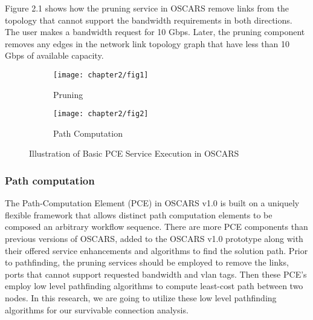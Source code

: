 Figure 2.1 shows how the pruning service in OSCARS remove links from the topology that cannot support the bandwidth requirements in both directions. The user makes a bandwidth request for 10 Gbps. Later, the pruning component removes any edges in the network link topology graph that have less than 10 Gbps of available capacity. 

\begin{figure*}[hbt!]
\centering
      	\begin{subfigure}{0.45\textwidth}
	\centering
		\texttt{[image: chapter2/fig1]}
		\caption{Pruning}
		\label{fig:pruning}
        \end{subfigure}%
	\hfill
	\begin{subfigure}{0.45\textwidth}\vspace{3em}
        	\centering
		\texttt{[image: chapter2/fig2]}\vspace{1em}
		\caption{Path Computation}\vspace{-3em}
		\label{fig:pathComputation}
        \end{subfigure}
	\hfill
\caption{Illustration of Basic PCE Service Execution in OSCARS}
\label{fig:basicPCE}
\end{figure*}


\subsubsection{Path computation}

The Path-Computation Element (PCE) in OSCARS v1.0 is built on a uniquely flexible framework that allows distinct path computation elements to be composed an arbitrary workflow sequence.  There are more PCE components than previous versions of OSCARS, added to the OSCARS v1.0 prototype along with their offered service enhancements and algorithms to find the solution path. Prior to pathfinding, the pruning services should be employed to remove the links, ports that cannot support requested bandwidth and vlan tags. Then these PCE's employ low level pathfinding algorithms to compute least-cost path between two nodes. In this research, we are going to utilize these low level pathfinding algorithms for our survivable connection analysis. 

